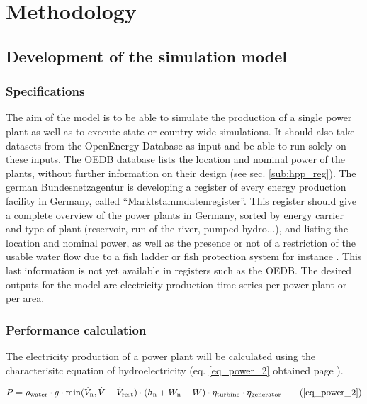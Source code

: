 \chapter{Methodology}
\label{chap:methodology}

\section{Development of the simulation model}

\subsection{Specifications}
\label{sub:spec}

The aim of the model is to be able to simulate the production of a single power plant as well as to execute state or country-wide simulations. It should also take datasets from the OpenEnergy Database as input and be able to run solely on these inputs. The OEDB database lists the location and nominal power of the plants, without further information on their design (see sec. \ref{sub:hpp_reg}). The german Bundesnetzagentur is developing a register of every energy production facility in Germany, called ``Marktstammdatenregister''. This register should give a complete overview of the power plants in Germany, sorted by energy carrier and type of plant (reservoir, run-of-the-river, pumped hydro...), and listing the location and nominal power, as well as the presence or not of a restriction of the usable water flow due to a fish ladder or fish protection system for instance \cite{MaStR}. This last information is not yet available in registers such as the OEDB.\newline
The desired outputs for the model are electricity production time series per power plant or per area.


\subsection{Performance calculation}
\label{sub:perf_calc}

The electricity production of a power plant will be calculated using the characterisitc equation of hydroelectricity (eq. \ref{eq_power_2} obtained page \pageref{eq_power_2}).

\begin{equation}
 P = \rho_\mathrm{water} \cdot g \cdot \min(\dot{V}_\mathrm{n},\dot{V}-\dot{V}_\mathrm{rest}) \cdot (h_\mathrm{n} +W_\mathrm{n}-W) \cdot \eta_\mathrm{turbine} \cdot \eta_\mathrm{generator}\tag{\ref{eq_power_2}}
\end{equation}

